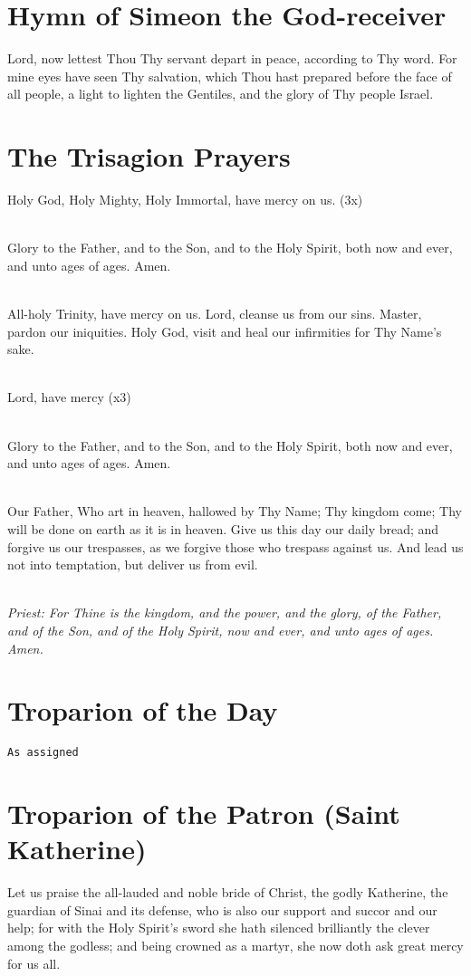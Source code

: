 \section*{Hymn of Simeon the God-receiver}
Lord, now lettest Thou Thy servant depart in peace, 
according to Thy word.
For mine eyes have seen Thy salvation,
which Thou hast prepared before the face of all people,
a light to lighten the Gentiles,
and the glory of Thy people Israel.

\section*{The Trisagion Prayers}
Holy God, Holy Mighty, Holy Immortal, have mercy on us. (3x)

\mbox{}\\
Glory to the Father, and to the Son, and to the Holy Spirit, both now and ever, and unto ages of ages. Amen.

\mbox{}\\
All-holy Trinity, have mercy on us.
Lord, cleanse us from our sins.
Master, pardon our iniquities.
Holy God, visit and heal our infirmities for Thy Name's sake.

\mbox{}\\
Lord, have mercy (x3)

\mbox{}\\
Glory to the Father, and to the Son, and to the Holy Spirit, both now and ever, and unto ages of ages. Amen.

\mbox{}\\
Our Father, Who art in heaven, hallowed by Thy Name;
Thy kingdom come; Thy will be done on earth as it is in heaven.
Give us this day our daily bread;
and forgive us our trespasses, as we forgive those who 
trespass against us.  And lead us not into temptation,
but deliver us from evil.

\mbox{}\\
\emph{Priest: For Thine is the kingdom, and the power, and the glory,
of the Father, and of the Son, and of the Holy Spirit, now and ever,
and unto ages of ages. Amen.}

\section*{Troparion of the Day}
\texttt{As assigned}

\section*{Troparion of the Patron (Saint Katherine)}
Let us praise the all-lauded and noble bride of Christ,
the godly Katherine,
the guardian of Sinai and its defense,
who is also our support and succor and our help;
for with the Holy Spirit's sword
she hath silenced brilliantly the clever among the godless;
and being crowned as a martyr, she now doth ask great mercy for us all.

